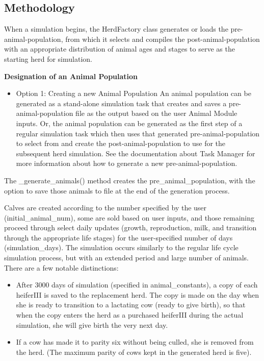 \documentclass[
  letterpaper,
  oneside,
  openany]{scrbook}
\providecommand{\tightlist}{%
  \setlength{\itemsep}{0pt}\setlength{\parskip}{0pt}}
\begin{document}
\subsection{Methodology}\label{methodology}

When a simulation begins, the HerdFactory class generates or loads the
pre-animal-population, from which it selects and compiles the
post-animal-population with an appropriate distribution of animal ages
and stages to serve as the starting herd for simulation.

\textbf{Designation of an Animal Population}

\begin{itemize}
\tightlist
\item
  Option 1: Creating a new Animal Population An animal population can be
  generated as a stand-alone simulation task that creates and saves a
  pre-animal-population file as the output based on the user Animal
  Module inputs. Or, the animal population can be generated as the first
  step of a regular simulation task which then uses that generated
  pre-animal-population to select from and create the
  post-animal-population to use for the subsequent herd simulation. See
  the documentation about Task Manager for more information about how to
  generate a new pre-animal-population.
\end{itemize}

The \_generate\_animals() method creates the pre\_animal\_population,
with the option to save those animals to file at the end of the
generation process.

Calves are created according to the number specified by the user
(initial\_animal\_num), some are sold based on user inputs, and those
remaining proceed through select daily updates (growth, reproduction,
milk, and transition through the appropriate life stages) for the
user-specified number of days (simulation\_days). The simulation occurs
similarly to the regular life cycle simulation process, but with an
extended period and large number of animals. There are a few notable
distinctions:

\begin{itemize}
\tightlist
\item
  After 3000 days of simulation (specified in animal\_constants), a copy
  of each heiferIII is saved to the replacement herd. The copy is made
  on the day when she is ready to transition to a lactating cow (ready
  to give birth), so that when the copy enters the herd as a purchased
  heiferIII during the actual simulation, she will give birth the very
  next day.
\item
  If a cow has made it to parity six without being culled, she is
  removed from the herd. (The maximum parity of cows kept in the
  generated herd is five).
\end{itemize}
\end{document}
